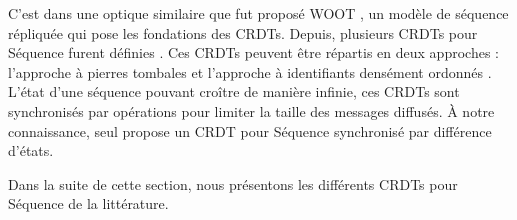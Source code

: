 C'est dans une optique similaire que fut proposé WOOT \cite{2006-woot-oster}, un modèle de séquence répliquée qui pose les fondations des \acp{CRDT}.
Depuis, plusieurs \acp{CRDT} pour Séquence furent définies \cite{ROH2011354, 2009-treedoc-preguica, 2009-logoot-weiss}.
Ces \acp{CRDT} peuvent être répartis en deux approches : l'approche à pierres tombales \cite{2006-woot-oster,ROH2011354} et l'approche à identifiants densément ordonnés \cite{2009-treedoc-preguica,2009-logoot-weiss}.
L'état d'une séquence pouvant croître de manière infinie, ces \acp{CRDT} sont synchronisés par opérations pour limiter la taille des messages diffusés.
À notre connaissance, seul \cite{2021-these-vic} propose un \ac{CRDT} pour Séquence synchronisé par différence d'états.

Dans la suite de cette section, nous présentons les différents \acp{CRDT} pour Séquence de la littérature.
